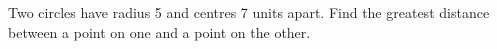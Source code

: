 Two circles have radius 5 and centres 7 units apart. Find the greatest distance between a point on one and a point on the other.
